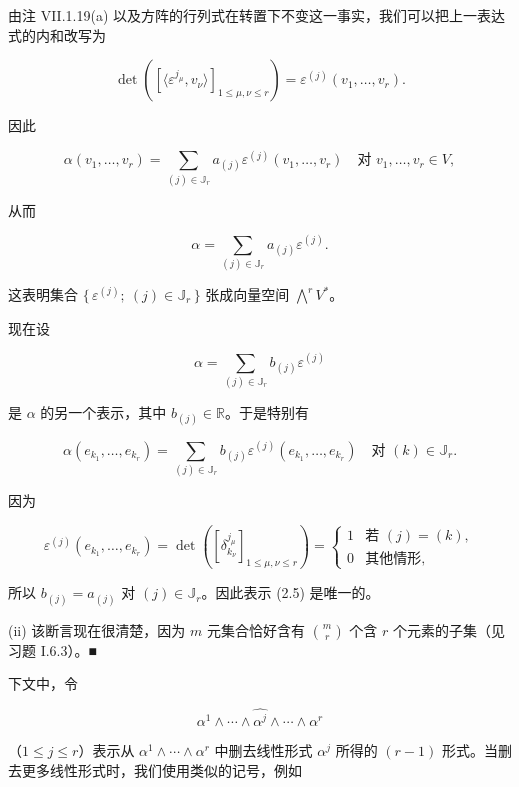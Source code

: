 \begin{proposition}
由注 VII.1.19(a) 以及方阵的行列式在转置下不变这一事实，我们可以把上一表达式的内和改写为

\[
\det\left(\left[\langle\varepsilon^{j_{\mu}},v_{\nu}\rangle\right]_{1\le\mu,\nu\le r}\right) = \varepsilon^{(j)}(v_{1},\ldots,v_{r}).
\]

因此

\[
\alpha(v_{1},\ldots,v_{r}) = \sum_{(j)\in\mathbb{J}_{r}} a_{(j)}\varepsilon^{(j)}(v_{1},\ldots,v_{r}) \quad \text{对 } v_{1},\ldots,v_{r} \in V,
\]

从而

\begin{equation}
\alpha = \sum_{(j)\in\mathbb{J}_{r}} a_{(j)}\varepsilon^{(j)}.\tag{2.5}
\end{equation}

这表明集合 $ \{\, \varepsilon^{(j)} ;\ (j) \in \mathbb{J}_{r} \,\} $ 张成向量空间 $ \bigwedge^{r}V^{*} $。

现在设

\[
\alpha = \sum_{(j)\in\mathbb{J}_{r}} b_{(j)}\varepsilon^{(j)}
\]

是 $ \alpha $ 的另一个表示，其中 $ b_{(j)} \in \mathbb{R} $。于是特别有

\[
\alpha(e_{k_{1}},\ldots,e_{k_{r}}) = \sum_{(j)\in\mathbb{J}_{r}} b_{(j)}\varepsilon^{(j)}(e_{k_{1}},\ldots,e_{k_{r}}) \quad \text{对 } (k) \in \mathbb{J}_{r}.
\]

因为

\begin{equation*}
\varepsilon^{(j)}(e_{k_{1}},\ldots,e_{k_{r}}) = \det\left(\left[\delta^{j_{\mu}}_{k_{\nu}}\right]_{1\le\mu,\nu\le r}\right) = \begin{cases} 1 & \text{若 } (j) = (k), \\ 0 & \text{其他情形}, \end{cases}
\end{equation*}

所以 $ b_{(j)} = a_{(j)} $ 对 $ (j) \in \mathbb{J}_{r} $。因此表示 (2.5) 是唯一的。

(ii) 该断言现在很清楚，因为 $ m $ 元集合恰好含有 $ \binom{m}{r} $ 个含 $ r $ 个元素的子集（见习题 I.6.3）。\nobreak\hspace{0.35em}■

\end{proposition}

下文中，令

\[
\alpha^{1}\wedge\cdots\wedge\widehat{\alpha^{j}}\wedge\cdots\wedge\alpha^{r}
\]

（$ 1 \le j \le r $）表示从 $ \alpha^{1}\wedge\cdots\wedge\alpha^{r} $ 中删去线性形式 $ \alpha^{j} $ 所得的 $ (r-1) $ 形式。当删去更多线性形式时，我们使用类似的记号，例如

